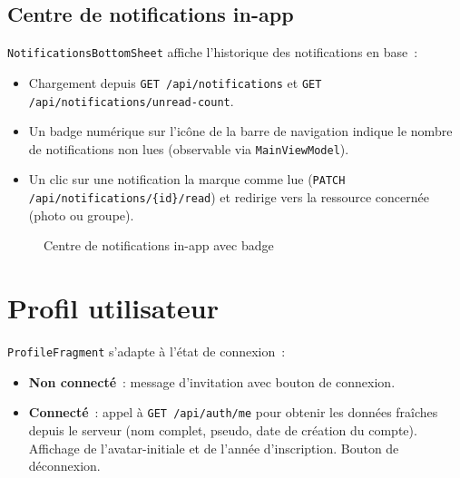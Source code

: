 \documentclass[12pt, a4paper, openany]{report}
\begin{document}
\subsection{Centre de notifications in-app}

\texttt{NotificationsBottomSheet} affiche l'historique des notifications en base~:
\begin{itemize}
  \item Chargement depuis \texttt{GET /api/notifications} et \texttt{GET /api/notifications/unread-count}.
  \item Un badge numérique sur l'icône de la barre de navigation indique le nombre
        de notifications non lues (observable via \texttt{MainViewModel}).
  \item Un clic sur une notification la marque comme lue (\texttt{PATCH /api/notifications/\{id\}/read})
        et redirige vers la ressource concernée (photo ou groupe).
\end{itemize}

\begin{figure}[H]
  \centering
  \caption{Centre de notifications in-app avec badge}
  \label{fig:notifications}
\end{figure}

\section{Profil utilisateur}

\texttt{ProfileFragment} s'adapte à l'état de connexion~:
\begin{itemize}
  \item \textbf{Non connecté}~: message d'invitation avec bouton de connexion.
  \item \textbf{Connecté}~: appel à \texttt{GET /api/auth/me} pour obtenir les données
        fraîches depuis le serveur (nom complet, pseudo, date de création du compte).
        Affichage de l'avatar-initiale et de l'année d'inscription.
        Bouton de déconnexion.
\end{itemize}
\end{document}
